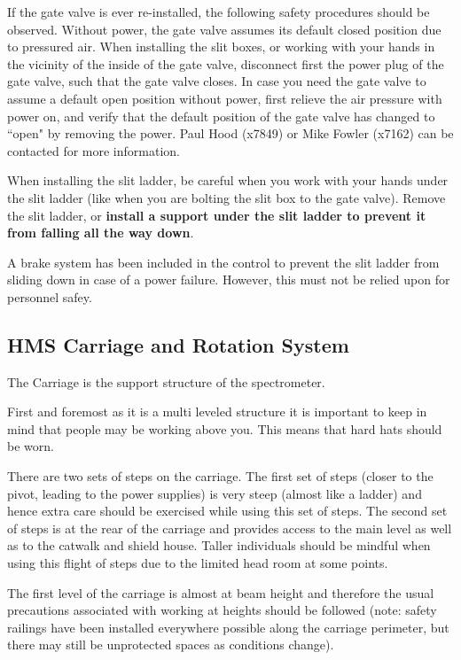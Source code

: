 If the gate valve is ever re-installed, the following safety
procedures should be observed.  Without power, the gate valve assumes its default closed position due to
pressured air. When installing the slit boxes, or working with your hands
in the vicinity of the inside of the gate valve, disconnect first the power
plug of the gate valve, such that the gate valve closes.
In case you need the gate valve to assume a default open position without
power, first relieve the air pressure
with power on, and verify that the default position of the gate valve has
changed to ``open" by removing the power. Paul Hood (x7849) or Mike Fowler
(x7162) can be contacted for more information.

When installing the slit ladder, be careful when you work with your hands
under the slit ladder (like when you are bolting the slit box to the
gate valve). Remove the slit ladder, or {\bf install a support under the slit
ladder to prevent it from falling all the way down}.

A brake system has been included in the control to prevent the slit ladder
from sliding down in case of a power failure.  However, this must not
be relied upon for personnel safey.


\subsection{HMS Carriage and Rotation System }

	The Carriage is the support structure of the spectrometer.

First and foremost as it is a multi leveled structure it is important to keep in
mind that people may be working above you. This means that hard hats should
be worn.

There are two sets of steps on the carriage. The first set of steps
(closer to the pivot, leading to the power supplies) is very
steep (almost like a ladder) and hence extra care should be exercised
while using this set of steps. The second set of steps is at the rear
of the carriage and provides access to the main level as well as to
the catwalk and shield house. Taller individuals should be mindful
when using this flight of steps due to the limited head room at some 
points.

The first level of the carriage is almost at beam height and therefore
the usual precautions associated with working at heights should be followed (note:
safety railings have been installed everywhere possible along the carriage
perimeter, but there may still be unprotected spaces as conditions change).

